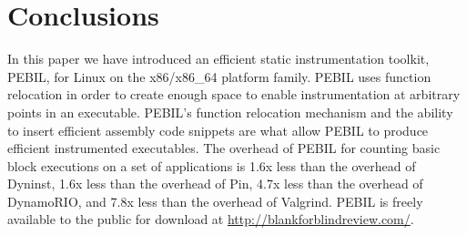 \section{Conclusions}
\label{sec:Conclusions}

In this paper we have introduced an efficient static instrumentation toolkit,
PEBIL, for Linux on the x86/x86\_64 platform family. PEBIL uses function
relocation in order to create enough space to enable instrumentation at
arbitrary points in an executable. PEBIL's function relocation mechanism and the
ability to insert efficient assembly code snippets are what allow PEBIL to
produce efficient instrumented executables. The overhead of PEBIL for counting
basic block executions on a set of applications is 1.6x less than the overhead of Dyninst, 
1.6x less than the overhead
of Pin, 4.7x less than the overhead of DynamoRIO, and 7.8x less than the overhead of
Valgrind. PEBIL is freely available
to the public for download at \url{http://blankforblindreview.com/}.



